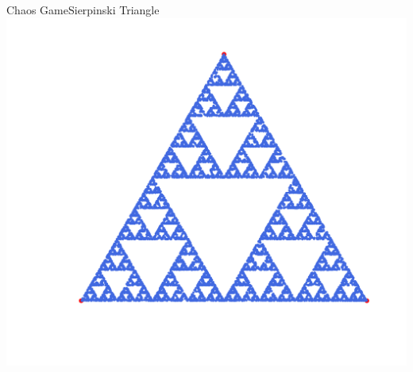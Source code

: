 \documentclass[usenames,dvipsnames,svgnames,10pt,aspectratio=169]{beamer}
\begin{document}
\begin{frame}[t, c]{Chaos Game}{Sierpinski Triangle}
	\centering
	\includegraphics[height=.9\textheight]{sierpinsky_3}
	\vspace{2cm}
\end{frame}
\end{document}
